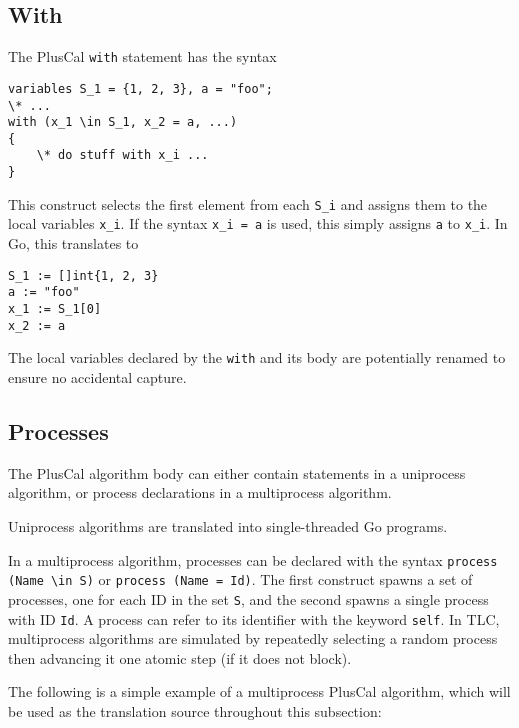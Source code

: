 \subsection{With}
The PlusCal \texttt{with} statement has the syntax

\noindent
\begin{minipage}[t]{\textwidth}
\begin{lstlisting}[language=pcal]
variables S_1 = {1, 2, 3}, a = "foo";
\* ...
with (x_1 \in S_1, x_2 = a, ...)
{
	\* do stuff with x_i ...
}
\end{lstlisting}
\end{minipage}

This construct selects the first element from each \texttt{S\_i} and assigns them to the local variables \texttt{x\_i}. If the syntax \texttt{x\_i = a} is used, this simply assigns \texttt{a} to \texttt{x\_i}. In Go, this translates to

\noindent
\begin{minipage}[t]{\textwidth}
\begin{lstlisting}[language=golang]
S_1 := []int{1, 2, 3}
a := "foo"
x_1 := S_1[0]
x_2 := a
\end{lstlisting}
\end{minipage}

The local variables declared by the \texttt{with} and its body are potentially renamed to ensure no accidental capture.

\subsection{Processes}
The PlusCal algorithm body can either contain statements in a uniprocess algorithm, or process declarations in a multiprocess algorithm.

Uniprocess algorithms are translated into single-threaded Go programs.

In a multiprocess algorithm, processes can be declared with the syntax \verb|process (Name \in S)| or \verb|process (Name = Id)|. The first construct spawns a set of processes, one for each ID in the set \texttt{S}, and the second spawns a single process with ID \texttt{Id}. A process can refer to its identifier with the keyword \texttt{self}. In TLC, multiprocess algorithms are simulated by repeatedly selecting a random process then advancing it one atomic step (if it does not block).

The following is a simple example of a multiprocess PlusCal algorithm, which will be used as the translation source throughout this subsection:

